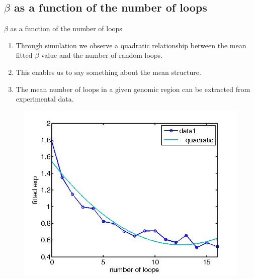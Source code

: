 \documentclass[8pt]{beamer}
\begin{document}
\subsection{$\beta$ as a function of the number of loops}\label{subsection_betaAsAFunctionOfTheNumberOfLoops}
\begin{frame}{$\beta$ as a function of the number of loops}
\begin{enumerate}
\item Through simulation we observe a quadratic relationship between the mean fitted $\beta$ value and the number of random loops.
\item This enables us to say something about the mean structure.
\item The mean number of loops in a given genomic region can be extracted from experimental data.
\end{enumerate}
\begin{figure}[H]
\includegraphics[scale=0.2]{changeOfExponentAsAfunctionOfLoopsStableLoopModelVariableLoops32Beads}
\end{figure}
\end{frame}
\end{document}
